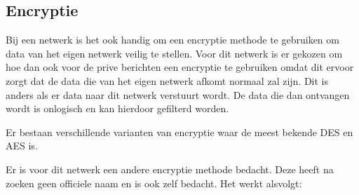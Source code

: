 
\subsection{Encryptie}
Bij een netwerk is het ook handig om een encryptie methode te gebruiken om data van het eigen netwerk veilig te stellen.
Voor dit netwerk is er gekozen om hoe dan ook voor de prive berichten een encryptie te gebruiken omdat dit ervoor zorgt 
dat de data die van het eigen netwerk afkomt normaal zal zijn. Dit is anders als er data naar dit netwerk verstuurt wordt. De 
data die dan ontvangen wordt is onlogisch en kan hierdoor gefilterd worden. 

Er bestaan verschillende varianten van encryptie waar de meest bekende DES en AES is. 


Er is voor dit netwerk een andere encryptie methode bedacht. Deze heeft na zoeken geen officiele naam en is ook zelf bedacht.
Het werkt alsvolgt:
